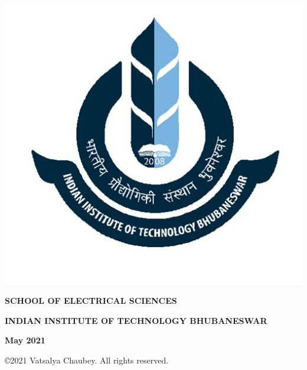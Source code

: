 \begin{titlepage}
\begin{center}
\includegraphics[scale=0.3]{iitbbs}
\end{center}
 \vspace{-1em}
\begin{center}
 \textbf{\small SCHOOL OF ELECTRICAL SCIENCES}
\end{center}
 \vspace{-3em}
\begin{center}
 \textbf{\small INDIAN INSTITUTE OF TECHNOLOGY BHUBANESWAR} 
\end{center}
 \vspace{-3em}
\begin{center}
 \textbf{May 2021}
\end{center}
 \vspace{-3em}
\begin{center}
 \copyright 2021 Vatsalya Chaubey. All rights reserved.
\end{center}
\cleardoublepage

\end{titlepage}

